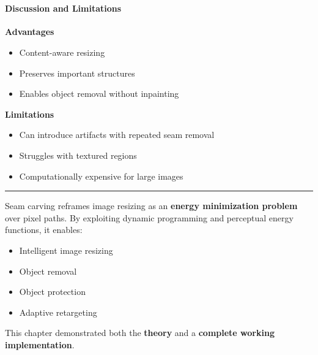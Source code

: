 \documentclass[11pt]{article}
\providecommand{\tightlist}{%
      \setlength{\itemsep}{0pt}\setlength{\parskip}{0pt}}
\begin{document}
    \begin{center}
    \end{center}
    { \hspace*{\fill} \\}
    
    \hypertarget{discussion-and-limitations}{%
\paragraph{\texorpdfstring{\textbf{Discussion and
Limitations}}{Discussion and Limitations}}\label{discussion-and-limitations}}

\textbf{Advantages}

\begin{itemize}
\tightlist
\item
  Content-aware resizing
\item
  Preserves important structures
\item
  Enables object removal without inpainting
\end{itemize}

\textbf{Limitations}

\begin{itemize}
\tightlist
\item
  Can introduce artifacts with repeated seam removal
\item
  Struggles with textured regions
\item
  Computationally expensive for large images
\end{itemize}

\begin{center}\rule{0.5\linewidth}{0.5pt}\end{center}

Seam carving reframes image resizing as an \textbf{energy minimization
problem} over pixel paths. By exploiting dynamic programming and
perceptual energy functions, it enables:

\begin{itemize}
\tightlist
\item
  Intelligent image resizing
\item
  Object removal
\item
  Object protection
\item
  Adaptive retargeting
\end{itemize}

This chapter demonstrated both the \textbf{theory} and a
\textbf{complete working implementation}.
\end{document}
